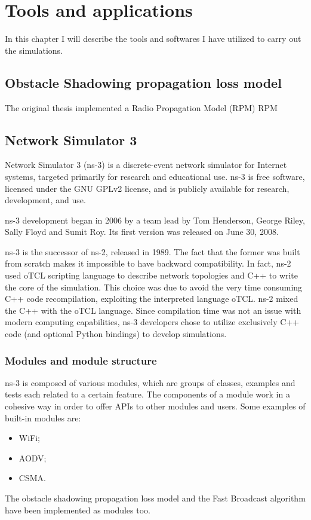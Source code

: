 
\chapter{Tools and applications}
	In this chapter I will describe the tools and softwares I have utilized to carry out the simulations.
	
	\section{Obstacle Shadowing propagation loss model}
		The original thesis \cite{ROM2017} implemented a Radio Propagation Model (RPM)  \gls{RPM}
	
	\section{Network Simulator 3}
		Network Simulator 3 (ns-3) is a discrete-event network simulator for Internet systems, targeted primarily for research and educational use. ns-3 is free software, licensed under the GNU GPLv2 license, and is publicly available for research, development, and use.
		
		
		ns-3 development began in 2006 by a team lead by Tom Henderson, George Riley, Sally Floyd and Sumit Roy. Its first version was released on June 30, 2008. 
		
		
		ns-3 is the successor of ns-2, released in 1989. The fact that the former was built from scratch makes it impossible to have backward compatibility. In fact, ns-2 used oTCL scripting language to describe network topologies and C++ to write the core of the simulation. This choice was due to avoid the very time consuming C++ code recompilation, exploiting the interpreted language oTCL. ns-2 mixed the  C++ with the  oTCL language. Since compilation time was not an issue with modern computing capabilities, ns-3 developers chose to utilize exclusively C++ code (and optional Python bindings) to develop simulations.
	
		\subsection{Modules and module structure}
			ns-3 is composed of various modules, which are groups of classes, examples and tests each related to a certain feature. The components of a module work in a cohesive way in order to offer APIs to other modules and users. Some examples of built-in modules are:
			\begin{itemize}
				\item WiFi;
				\item AODV; 
				\item CSMA.
			\end{itemize}
			The obstacle shadowing propagation loss model and the Fast Broadcast algorithm have been implemented as modules too.
			
